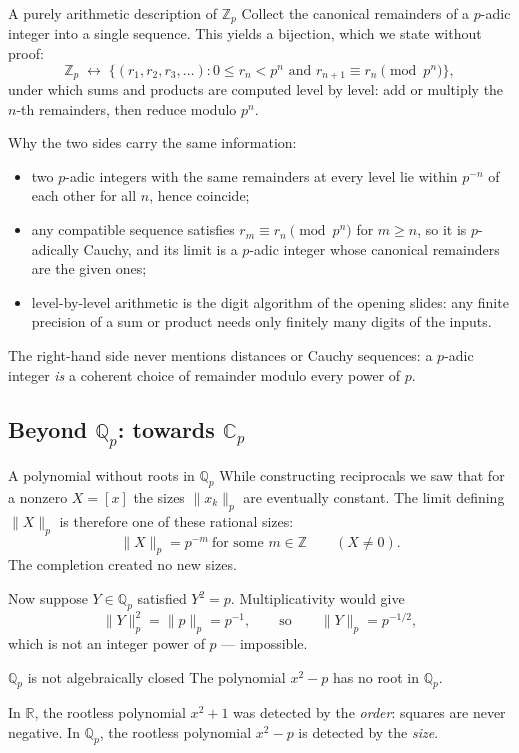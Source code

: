 \documentclass[aspectratio=169,11pt]{beamer}
\newcommand{\Z}{\mathbb Z}
\newcommand{\Q}{\mathbb Q}
\newcommand{\R}{\mathbb R}
\newcommand{\C}{\mathbb C}
\begin{document}
\begin{frame}{A purely arithmetic description of \(\Z_p\)}
  \small
  Collect the canonical remainders of a \(p\)-adic integer into a single
  sequence.  This yields a bijection, which we state without proof:
  \[
    \boxed{\Z_p\;\longleftrightarrow\;
      \bigl\{(r_1,r_2,r_3,\ldots):
        0\le r_n<p^n
        \text{ and }
        r_{n+1}\equiv r_n\pmod{p^n}\bigr\},}
  \]
  under which sums and products are computed \alert{level by level}: add
  or multiply the \(n\)-th remainders, then reduce modulo \(p^n\).

  \medskip
  Why the two sides carry the same information:
  \begin{itemize}
    \item two \(p\)-adic integers with the same remainders at every level
      lie within \(p^{-n}\) of each other for all \(n\), hence coincide;
    \item any compatible sequence satisfies \(r_m\equiv r_n\pmod{p^n}\)
      for \(m\ge n\), so it is \(p\)-adically Cauchy, and its limit is a
      \(p\)-adic integer whose canonical remainders are the given ones;
    \item level-by-level arithmetic is the digit algorithm of the opening
      slides: any finite precision of a sum or product needs only
      finitely many digits of the inputs.
  \end{itemize}

  \medskip
  The right-hand side never mentions distances or Cauchy sequences: a
  \(p\)-adic integer \emph{is} a coherent choice of remainder modulo
  every power of \(p\).
\end{frame}

\subsection{\texorpdfstring{Beyond \(\Q_p\): towards \(\C_p\)}{Beyond Qp: towards Cp}}

\begin{frame}{A polynomial without roots in \(\Q_p\)}
  While constructing reciprocals we saw that for a nonzero \(X=[x]\) the
  sizes \(\|x_k\|_p\) are eventually constant.  The limit defining
  \(\|X\|_p\) is therefore one of these rational sizes:
  \[
    \boxed{\|X\|_p=p^{-m}\ \text{for some }m\in\Z\qquad(X\ne0).}
  \]
  The completion created no new sizes.

  Now suppose \(Y\in\Q_p\) satisfied \(Y^2=p\).  Multiplicativity would
  give
  \[
    \|Y\|_p^2=\|p\|_p=p^{-1},
    \qquad\text{so}\qquad
    \|Y\|_p=p^{-1/2},
  \]
  which is not an integer power of \(p\) --- impossible.

  \begin{alertblock}{\(\Q_p\) is not algebraically closed}
    The polynomial \(x^2-p\) has no root in \(\Q_p\).
  \end{alertblock}

  In \(\R\), the rootless polynomial \(x^2+1\) was detected by the
  \emph{order}: squares are never negative.  In \(\Q_p\), the rootless
  polynomial \(x^2-p\) is detected by the \emph{size}.
\end{frame}
\end{document}
